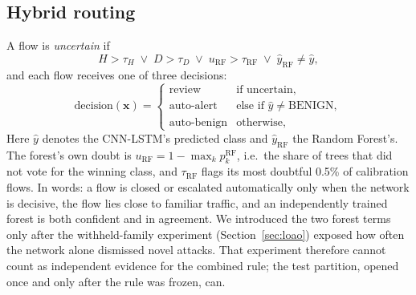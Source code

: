 \documentclass[conference]{IEEEtran}
\begin{document}
\subsection{Hybrid routing}
A flow is \emph{uncertain} if
\begin{equation}
H>\tau_H \;\lor\; D>\tau_D \;\lor\; u_{\mathrm{RF}}>\tau_{\mathrm{RF}} \;\lor\; \hat{y}_{\mathrm{RF}}\neq\hat{y},
\end{equation}
and each flow receives one of three decisions:
\begin{equation}
\text{decision}(\mathbf{x}) =
\begin{cases}
\text{review} & \text{if uncertain},\\
\text{auto-alert} & \text{else if } \hat{y}\neq\text{BENIGN},\\
\text{auto-benign} & \text{otherwise,}
\end{cases}
\end{equation}
Here $\hat{y}$ denotes the CNN-LSTM's predicted class and $\hat{y}_{\mathrm{RF}}$ the Random
Forest's. The forest's own doubt is $u_{\mathrm{RF}} = 1-\max_k p^{\mathrm{RF}}_k$, i.e.\ the
share of trees that did not vote for the winning class, and $\tau_{\mathrm{RF}}$ flags its most
doubtful 0.5\% of calibration flows. In words: a flow is closed or escalated automatically only
when the network is decisive, the flow lies close to familiar traffic, and an independently
trained forest is both confident and in agreement. We introduced the two forest terms only after
the withheld-family experiment (Section~\ref{sec:loao}) exposed how often the network alone
dismissed novel attacks. That experiment therefore cannot count as independent evidence for the
combined rule; the test partition, opened once and only after the rule was frozen, can.
\end{document}
